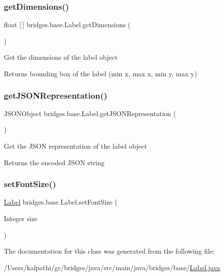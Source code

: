 \subsubsection{\texorpdfstring{getDimensions()}{getDimensions()}}
{\footnotesize\ttfamily float \mbox{[}$\,$\mbox{]} bridges.\+base.\+Label.\+get\+Dimensions (\begin{DoxyParamCaption}{ }\end{DoxyParamCaption})}

Get the dimensions of the label object \begin{DoxyReturn}{Returns}
bounding box of the label (min x, max x, min y, max y) 
\end{DoxyReturn}
\mbox{\label{classbridges_1_1base_1_1_label_a6befc6655ce36868213be289571c6315}} 
\subsubsection{\texorpdfstring{getJSONRepresentation()}{getJSONRepresentation()}}
{\footnotesize\ttfamily J\+S\+O\+N\+Object bridges.\+base.\+Label.\+get\+J\+S\+O\+N\+Representation (\begin{DoxyParamCaption}{ }\end{DoxyParamCaption})}

Get the J\+S\+ON representation of the label object

\begin{DoxyReturn}{Returns}
the encoded J\+S\+ON string 
\end{DoxyReturn}
\mbox{\label{classbridges_1_1base_1_1_label_ab5f2d60e519db2499f326c4ccb967b25}} 
\subsubsection{\texorpdfstring{setFontSize()}{setFontSize()}}
{\footnotesize\ttfamily \mbox{\hyperlink{classbridges_1_1base_1_1_label}{Label}} bridges.\+base.\+Label.\+set\+Font\+Size (\begin{DoxyParamCaption}\item[{Integer}]{size }\end{DoxyParamCaption})}



The documentation for this class was generated from the following file\+:\begin{DoxyCompactItemize}
\item 
/\+Users/kalpathi/gr/bridges/java/src/main/java/bridges/base/\mbox{\hyperlink{_label_8java}{Label.\+java}}\end{DoxyCompactItemize}
